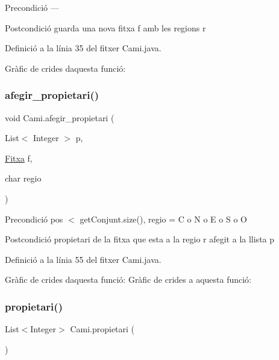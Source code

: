 \begin{DoxyPrecond}{Precondició}
--- 
\end{DoxyPrecond}
\begin{DoxyPostcond}{Postcondició}
guarda una nova fitxa f amb les regions r 
\end{DoxyPostcond}


Definició a la línia 35 del fitxer Cami.\+java.

Gràfic de crides d\textquotesingle{}aquesta funció\+:
\mbox{\label{class_cami_a768f6b93fa51199b1db2806157816685}} 
\subsubsection{\texorpdfstring{afegir\+\_\+propietari()}{afegir\_propietari()}}
{\footnotesize\ttfamily void Cami.\+afegir\+\_\+propietari (\begin{DoxyParamCaption}\item[{List$<$ Integer $>$}]{p,  }\item[{\mbox{\hyperlink{class_fitxa}{Fitxa}}}]{f,  }\item[{char}]{regio }\end{DoxyParamCaption})\hspace{0.3cm}{\ttfamily [private]}}

\begin{DoxyPrecond}{Precondició}
pos $<$ get\+Conjunt.\+size(), regio = C o N o E o S o O 
\end{DoxyPrecond}
\begin{DoxyPostcond}{Postcondició}
propietari de la fitxa que esta a la regio r afegit a la llista p 
\end{DoxyPostcond}


Definició a la línia 55 del fitxer Cami.\+java.

Gràfic de crides d\textquotesingle{}aquesta funció\+:
Gràfic de crides a aquesta funció\+:
\mbox{\label{class_cami_aae88bb5689726211e87747aeeb6abad0}} 
\subsubsection{\texorpdfstring{propietari()}{propietari()}}
{\footnotesize\ttfamily List$<$Integer$>$ Cami.\+propietari (\begin{DoxyParamCaption}{ }\end{DoxyParamCaption})}

